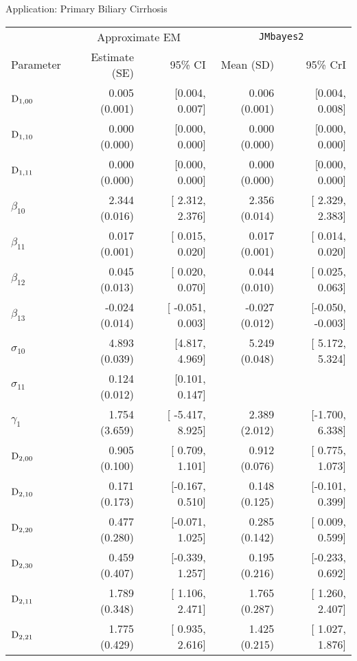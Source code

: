 \begin{chapter}{\label{cha:app-PBC}Application: Primary Biliary Cirrhosis}
  \begin{table}[ht]
    \centering
    \captionsetup{font=scriptsize}
    \begingroup\scriptsize
    \begin{tabular}{lrrrr}
        & \multicolumn{2}{c}{Approximate EM} & \multicolumn{2}{c}{\tt{JMbayes2}}\\
        Parameter & Estimate (SE) & 95\% CI & Mean (SD) & 95\% CrI \\
        \hline
        $\mathrm{D}_{1,00}$ & 0.005 (0.001) & [0.004, 0.007] & 0.006 (0.001) & [0.004, 0.008] \\ 
        $\mathrm{D}_{1,10}$ & 0.000 (0.000) & [0.000, 0.000] & 0.000 (0.000) & [0.000, 0.000] \\ 
        $\mathrm{D}_{1,11}$ & 0.000 (0.000) & [0.000, 0.000] & 0.000 (0.000) & [0.000, 0.000] \\ 
        $\beta_{10}$ &   2.344 (0.016) & [  2.312,   2.376] &  2.356 (0.014) & [ 2.329,  2.383] \\ 
        $\beta_{11}$ &   0.017 (0.001) & [  0.015,   0.020] &  0.017 (0.001) & [ 0.014,  0.020] \\ 
        $\beta_{12}$ &   0.045 (0.013) & [  0.020,   0.070] &  0.044 (0.010) & [ 0.025,  0.063] \\ 
        $\beta_{13}$ &  -0.024 (0.014) & [ -0.051,   0.003] & -0.027 (0.012) & [-0.050, -0.003] \\ 
        $\sigma_{10}$ & 4.893 (0.039) & [4.817, 4.969] &  5.249 (0.048) & [ 5.172,  5.324] \\ 
        $\sigma_{11}$ &   0.124 (0.012) & [0.101, 0.147] &  {} & {} \\ %
        $\gamma_1$ &   1.754 (3.659) & [ -5.417,   8.925] &  2.389 (2.012) & [-1.700,  6.338] \\ 
        \hdashline
        $\mathrm{D}_{2,00}$ & 0.905 (0.100) & [ 0.709, 1.101] & 0.912 (0.076) & [ 0.775, 1.073] \\ 
        $\mathrm{D}_{2,10}$ & 0.171 (0.173) & [-0.167, 0.510] & 0.148 (0.125) & [-0.101, 0.399] \\ 
        $\mathrm{D}_{2,20}$ & 0.477 (0.280) & [-0.071, 1.025] & 0.285 (0.142) & [ 0.009, 0.599] \\ 
        $\mathrm{D}_{2,30}$ & 0.459 (0.407) & [-0.339, 1.257] & 0.195 (0.216) & [-0.233, 0.692] \\ 
        $\mathrm{D}_{2,11}$ & 1.789 (0.348) & [ 1.106, 2.471] & 1.765 (0.287) & [ 1.260, 2.407] \\ 
        $\mathrm{D}_{2,21}$ & 1.775 (0.429) & [ 0.935, 2.616] & 1.425 (0.215) & [ 1.027, 1.876] \\ 

\end{tabular}
\end{table}
\end{chapter}
